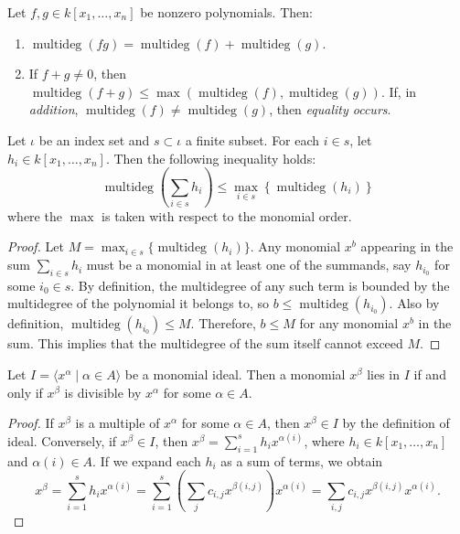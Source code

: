 \begin{lemma}\label{lem:degree_sum_le} %
  \leanok %
  Let $f, g \in k[x_1, \dots, x_n]$ be nonzero polynomials. Then:
  \begin{enumerate}
      \item $\operatorname{multideg}(fg) = \operatorname{multideg}(f) + \operatorname{multideg}(g)$.
      \item If $f + g \neq 0$, then $\operatorname{multideg}(f + g) \le \max(\operatorname{multideg}(f), \operatorname{multideg}(g))$. 
        If, in \textit{addition}, $\operatorname{multideg}(f) \neq \operatorname{multideg}(g)$, then \textit{equality occurs}.
  \end{enumerate}
\end{lemma}

\begin{lemma}\label{lem:degree_sum_le_syn}
  \leanok %
  Let $\iota$ be an index set and $s \subset \iota$ a finite subset. For each $i \in s$, let $h_i \in k[x_1,\dots,x_n]$. 
  Then the following inequality holds:
  \[
  \operatorname{multideg}\left(\sum_{i \in s} h_i\right) \le \max_{i \in s} \left\{ \operatorname{multideg}(h_i) \right\}
  \]
  where the $\max$ is taken with respect to the monomial order.
\end{lemma}
\begin{proof}
  Let $M = \max_{i \in s} \{ \operatorname{multideg}(h_i) \}$. 
  Any monomial $x^b$ appearing in the sum $\sum_{i \in s} h_i$ must be a monomial in at least one of the summands, say $h_{i_0}$ for some $i_0 \in s$.
  By definition, the multidegree of any such term is bounded by the multidegree of the polynomial it belongs to, so $b \le \operatorname{multideg}(h_{i_0})$.
  Also by definition, $\operatorname{multideg}(h_{i_0}) \le M$.
  Therefore, $b \le M$ for any monomial $x^b$ in the sum. This implies that the multidegree of the sum itself cannot exceed $M$.
\end{proof}

\begin{lemma}\label{lem:mem_monomialIdeal_iff_divisible} %
    \leanok %
    Let $I = \langle x^\alpha \mid \alpha \in A \rangle$ be a monomial ideal.
    Then a monomial $x^\beta$ lies in $I$ if and only if $x^\beta$ is divisible by $x^\alpha$ for some $\alpha \in A$.
\end{lemma}
\begin{proof}
  \leanok
  If $x^\beta$ is a multiple of $x^\alpha$ for some $\alpha \in A$, then $x^\beta \in I$ by the definition of ideal. 
  Conversely, if $x^\beta \in I$, then $x^\beta = \sum_{i=1}^s h_i x^{\alpha(i)}$, where $h_i \in k[x_1, \dots, x_n]$ and $\alpha(i) \in A$. 
  If we expand each $h_i$ as a sum of terms, we obtain
  \[
  x^\beta = \sum_{i=1}^s h_i x^{\alpha(i)} = \sum_{i=1}^s \left(\sum_j c_{i,j} x^{\beta(i,j)}\right) x^{\alpha(i)} = \sum_{i,j} c_{i,j} x^{\beta(i,j)} x^{\alpha(i)}.
  \]
\end{proof}

